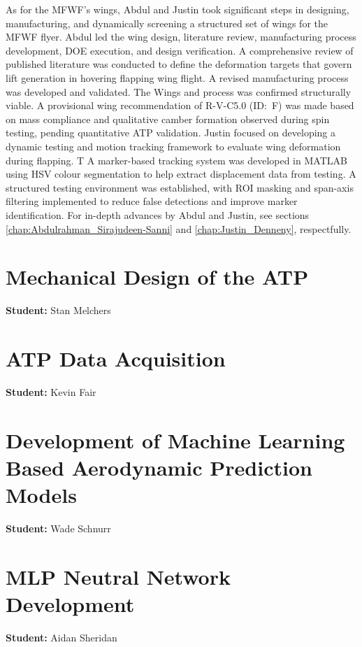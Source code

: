\indent As for the MFWF's wings, Abdul and Justin took significant steps in designing, manufacturing, and dynamically screening a structured set of wings for the MFWF flyer. Abdul led the wing design, literature review, manufacturing process development, DOE execution, and design verification. A comprehensive review of published literature was conducted to define the deformation targets that govern lift generation in hovering flapping wing flight. A revised manufacturing process was developed and validated. The Wings and process was confirmed structurally viable. A provisional wing recommendation of R-V-C5.0 (ID:~F) was made based on mass compliance and qualitative camber formation observed during spin testing, pending quantitative ATP validation. Justin focused on developing a dynamic testing and motion tracking framework to evaluate wing deformation during flapping. T A marker-based tracking system was developed in MATLAB using HSV colour segmentation to help extract displacement data from testing. A structured testing environment was established, with ROI masking and span-axis filtering implemented to reduce false detections and improve marker identification. For in-depth advances by Abdul and Justin, see sections \ref{chap:Abdulrahman_Sirajudeen-Sanni} and \ref{chap:Justin_Denneny}, respectfully.




\newpage
\section{Mechanical Design of the ATP}
\label{chap:Stan_Melchers}
\textbf{Student:} Stan Melchers


\clearpage
\section{ATP Data Acquisition}
\label{chap:Kevin_Fair}
\textbf{Student:} Kevin Fair


\newpage
\section{Development of Machine Learning Based Aerodynamic Prediction Models}
\label{chap:Wade_Schnurr}
\textbf{Student:} Wade Schnurr


\newpage
\section{MLP Neutral Network Development}
\label{chap:Aidan_Sheridan}
\textbf{Student:} Aidan Sheridan


